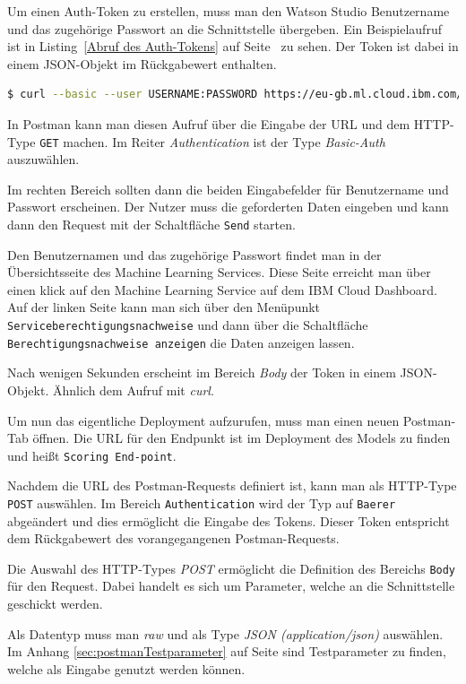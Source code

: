 Um einen Auth-Token zu erstellen, muss man den Watson Studio Benutzername und das zugehörige Passwort an die Schnittstelle
übergeben. Ein Beispielaufruf ist in Listing~\ref{Abruf des Auth-Tokens} auf Seite~\pageref{Abruf des Auth-Tokens}
zu sehen. Der Token ist dabei in einem JSON-Objekt im Rückgabewert enthalten.

\begin{lstlisting}[language=bash, caption=Abruf des Auth-Tokens, label=Abruf des Auth-Tokens]
$ curl --basic --user USERNAME:PASSWORD https://eu-gb.ml.cloud.ibm.com/v3/identity/token
\end{lstlisting}

In Postman kann man diesen Aufruf über die Eingabe der URL und dem HTTP-Type \texttt{GET} machen. Im Reiter
\textit{Authentication} ist der Type \textit{Basic-Auth} auszuwählen.

Im rechten Bereich sollten dann die beiden Eingabefelder für Benutzername und Passwort erscheinen. Der Nutzer muss die
geforderten Daten eingeben und kann dann den Request mit der Schaltfläche \texttt{Send} starten.

Den Benutzernamen und das zugehörige Passwort findet man in der Übersichtsseite des Machine Learning Services. Diese
Seite erreicht man über einen klick auf den Machine Learning Service auf dem IBM Cloud Dashboard. Auf der linken Seite
kann man sich über den Menüpunkt \texttt{Serviceberechtigungsnachweise} und dann über die Schaltfläche
\texttt{Berechtigungsnachweise anzeigen} die Daten anzeigen lassen.

Nach wenigen Sekunden erscheint im Bereich \textit{Body} der Token in einem JSON-Objekt. Ähnlich dem Aufruf mit
\textit{curl}.

Um nun das eigentliche Deployment aufzurufen, muss man einen neuen Postman-Tab öffnen. Die URL für den Endpunkt ist im
Deployment des Models zu finden und heißt \texttt{Scoring End-point}.

Nachdem die URL des Postman-Requests definiert ist, kann man als HTTP-Type \texttt{POST} auswählen. Im Bereich
\texttt{Authentication} wird der Typ auf \texttt{Baerer} abgeändert und dies ermöglicht die Eingabe des Tokens. Dieser
Token entspricht dem Rückgabewert des vorangegangenen Postman-Requests.

Die Auswahl des HTTP-Types \textit{POST} ermöglicht die Definition des Bereichs \texttt{Body} für den Request. Dabei
handelt es sich um Parameter, welche an die Schnittstelle geschickt werden.

Als Datentyp muss man \textit{raw} und als Type \textit{JSON (application/json)} auswählen. Im Anhang
\ref{sec:postmanTestparameter} auf Seite \pageref{sec:postmanTestparameter} sind Testparameter zu finden, welche als
Eingabe genutzt werden können.


